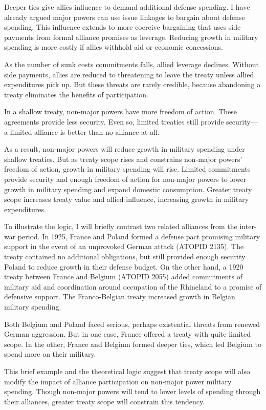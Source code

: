 \documentclass[12pt]{article}
\begin{document}
Deeper ties give allies influence to demand additional defense spending. 
I have already argued major powers can use issue linkages to bargain about defense spending. 
This influence extends to more coercive bargaining that uses side payments from formal alliance promises as leverage. 
Reducing growth in military spending is more costly if allies withhold aid or economic concessions. 


As the number of sunk costs commitments falls, allied leverage declines. 
Without side payments, allies are reduced to threatening to leave the treaty unless allied expenditures pick up. 
But these threats are rarely credible, because abandoning a treaty eliminates the benefits of participation. 


In a shallow treaty, non-major powers have more freedom of action.  
These agreements provide less security.  
Even so, limited treaties still provide security--- a limited alliance is better than no alliance at all. 


As a result, non-major powers will reduce growth in military spending under shallow treaties. 
But as treaty scope rises and constrains non-major powers' freedom of action, growth in military spending will rise. 
Limited commitments provide security and enough freedom of action for non-major powers to lower growth in military spending and expand domestic consumption. 
Greater treaty scope increases treaty value and allied influence, increasing growth in military expenditures. 


To illustrate the logic, I will briefly contrast two related alliances from the inter-war period. 
In 1925, France and Poland formed a defense pact promising military support in the event of an unprovoked German attack (ATOPID 2135). 
The treaty contained no additional obligations, but still provided enough security Poland to reduce growth in their defense budget.
On the other hand, a 1920 treaty between France and Belgium (ATOPID 2055) added commitments of military aid and coordination around occupation of the Rhineland to a promise of defensive support. 
The Franco-Belgian treaty increased growth in Belgian military spending. 


Both Belgium and Poland faced serious, perhaps existential threats from renewed German aggression. 
But in one case, France offered a treaty with quite limited scope. 
In the other, France and Belgium formed deeper ties, which led Belgium to spend more on their military. 


This brief example and the theoretical logic suggest that treaty scope will also modify the impact of alliance participation on non-major power military spending. 
Though non-major powers will tend to lower levels of spending through their alliances, greater treaty scope will constrain this tendency. 
\end{document}
